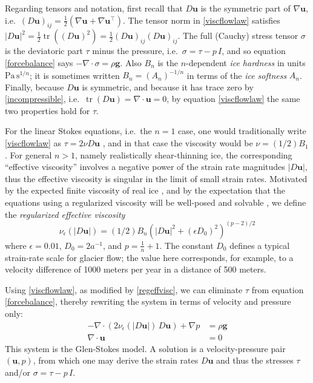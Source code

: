 \documentclass[letterpaper,final,12pt,reqno]{amsart}
\newcommand{\eps}{\epsilon}
\newcommand{\grad}{\nabla}
\newcommand{\Div}{\nabla\cdot}
\newcommand{\trace}{\operatorname{tr}}
\newcommand{\bg}{\mathbf{g}}
\newcommand{\bu}{\mathbf{u}}
\begin{document}
Regarding tensors and notation, first recall that $D\bu$ is the symmetric part of $\grad \bu$, i.e.~$(D\bu)_{ij} = \frac{1}{2} \left(\grad\bu + \grad\bu^\top\right)$.  The tensor norm in \eqref{viscflowlaw} satisfies $|D\bu|^2 = \frac{1}{2} \trace\left((D\bu)^2\right) = \frac{1}{2} (D\bu)_{ij} (D\bu)_{ij}$.  The full (Cauchy) stress tensor $\sigma$ is the deviatoric part $\tau$ minus the pressure, i.e.~$\sigma = \tau - p\,I$, and so equation \eqref{forcebalance} says $-\Div \sigma = \rho \bg$.  Also $B_n$ is the $n$-dependent \emph{ice hardness} in units $\text{Pa}\,\text{s}^{1/n}$; it is sometimes written $B_n = (A_n)^{-1/n}$ in terms of the \emph{ice softness} $A_n$.  Finally, because $D\bu$ is symmetric, and because it has trace zero by \eqref{incompressible}, i.e.~$\trace(D\bu)=\nabla \cdot \bu = 0$, by equation \eqref{viscflowlaw} the same two properties hold for $\tau$.

For the linear Stokes equations, i.e.~the $n=1$ case, one would traditionally write \eqref{viscflowlaw} as $\tau = 2\nu D\bu$ \cite{Elmanetal2014}, and in that case the viscosity would be $\nu = (1/2) B_1$.  For general $n>1$, namely realistically shear-thinning ice, the corresponding ``effective viscosity'' involves a negative power of the strain rate magnitudes $|D\bu|$, thus the effective viscosity is singular in the limit of small strain rates.  Motivated by the expected finite viscosity of real ice \cite{GreveBlatter2009}, and by the expectation that the equations using a regularized viscosity will be well-posed and solvable \cite{JouvetRappaz2011}, we define the \emph{regularized effective viscosity}
\begin{equation}
\nu_\eps(|D\bu|) = (1/2) B_n \left(|D\bu|^2 + (\eps D_0)^2\right)^{(p-2)/2} \label{regeffvisc}
\end{equation}
where $\eps = 0.01$, $D_0 = 2 a^{-1}$, and $p=\frac{1}{n}+1$.  The constant $D_0$ defines a typical strain-rate scale for glacier flow; the value here corresponds, for example, to a velocity difference of 1000 meters per year in a distance of 500 meters.

Using \eqref{viscflowlaw}, as modified by \eqref{regeffvisc}, we can eliminate $\tau$ from equation \eqref{forcebalance}, thereby rewriting the system in terms of velocity and pressure only:
\begin{align}
- \nabla \cdot \left(2 \nu_\eps(|D\bu|)\, D\bu\right) + \nabla p &= \rho \mathbf{g} \label{stokes} \\
\Div \bu &= 0 \label{incompagain}
\end{align}
This system is the Glen-Stokes model.  A solution is a velocity-pressure pair $(\bu,p)$, from which one may derive the strain rates $D\bu$ and thus the stresses $\tau$ and/or $\sigma = \tau - p\,I$.
\end{document}
